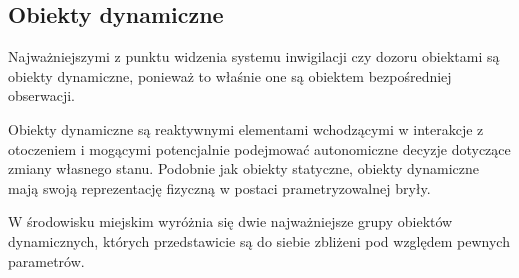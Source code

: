 {{\subsection{Obiekty dynamiczne}
\par{
Najważniejszymi z punktu widzenia systemu inwigilacji czy dozoru obiektami są obiekty dynamiczne, ponieważ to właśnie one są obiektem bezpośredniej obserwacji.
}
\par{
Obiekty dynamiczne są reaktywnymi elementami wchodzącymi w interakcje z otoczeniem i mogącymi potencjalnie podejmować autonomiczne decyzje dotyczące zmiany własnego stanu. Podobnie jak obiekty statyczne, obiekty dynamiczne mają swoją reprezentację fizyczną w postaci prametryzowalnej bryły.
}
\par{
W środowisku miejskim wyróżnia się dwie najważniejsze grupy obiektów dynamicznych, których przedstawicie są do siebie zbliżeni pod względem pewnych parametrów.
}
}}

